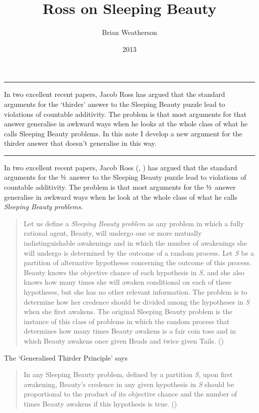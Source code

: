\documentclass[
  10pt,
  letterpaper,
  DIV=11,
  numbers=noendperiod,
  twoside]{scrartcl}
\title{Ross on Sleeping Beauty}
\author{Brian Weatherson}
\date{2013}
\renewenvironment{abstract}
 {\vspace{-1.25cm}
 \quotation\small\noindent\rule{\linewidth}{.5pt}\par\smallskip
 \noindent }
 {\par\noindent\rule{\linewidth}{.5pt}\endquotation}
\begin{document}
\maketitle
\begin{abstract}
In two excellent recent papers, Jacob Ross has argued that the standard
arguments for the `thirder' answer to the Sleeping Beauty puzzle lead to
violations of countable additivity. The problem is that most arguments
for that answer generalise in awkward ways when he looks at the whole
class of what he calls Sleeping Beauty problems. In this note I develop
a new argument for the thirder answer that doesn't generalise in this
way.
\end{abstract}


In two excellent recent papers, Jacob Ross
(, ) has
argued that the standard arguments for the ⅓~answer to the Sleeping
Beauty puzzle lead to violations of countable additivity. The problem is
that most arguments for the ⅓~answer generalise in awkward ways when he
look at the whole class of what he calls \emph{Sleeping Beauty
problems}.

\begin{quote}
Let us define a \emph{Sleeping Beauty problem} as any problem in which a
fully rational agent, Beauty, will undergo one or more mutually
indistinguishable awakenings and in which the number of awakenings she
will undergo is determined by the outcome of a random process. Let
\emph{S} be a partition of alternative hypotheses concerning the outcome
of this process. Beauty knows the objective chance of each hypothesis in
\emph{S}, and she also knows how many times she will awaken conditional
on each of these hypotheses, but she has no other relevant information.
The problem is to determine how her credence should be divided among the
hypotheses in \emph{S} when she first awakens. The original Sleeping
Beauty problem is the instance of this class of problems in which the
random process that determines how many times Beauty awakens is a fair
coin toss and in which Beauty awakens once given Heads and twice given
Tails. ()
\end{quote}

The `Generalised Thirder Principle' says

\begin{quote}
In any Sleeping Beauty problem, defined by a partition \emph{S}, upon
first awakening, Beauty's credence in any given hypothesis in \emph{S}
should be proportional to the product of its objective chance and the
number of times Beauty awakens if this hypothesis is true.
()
\end{quote}
\end{document}
